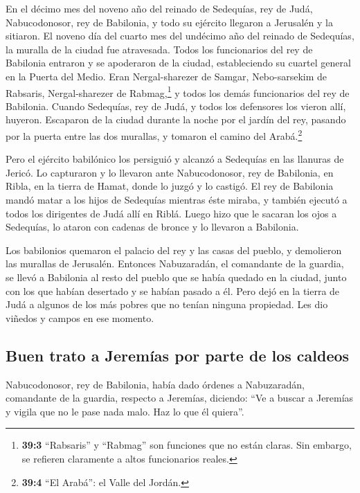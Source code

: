  En el décimo mes del noveno año del reinado de Sedequías,
rey de Judá, Nabucodonosor, rey de Babilonia, y todo su ejército
llegaron a Jerusalén y la sitiaron.  El noveno día del
cuarto mes del undécimo año del reinado de Sedequías, la muralla de la
ciudad fue atravesada.  Todos los funcionarios del rey de
Babilonia entraron y se apoderaron de la ciudad, estableciendo su
cuartel general en la Puerta del Medio. Eran Nergal-sharezer de Samgar,
Nebo-sarsekim de Rabsaris, Nergal-sharezer de Rabmag,\footnote{\textbf{39:3}
  ``Rabsaris'' y ``Rabmag'' son funciones que no están claras. Sin
  embargo, se refieren claramente a altos funcionarios reales.} y todos
los demás funcionarios del rey de Babilonia.  Cuando
Sedequías, rey de Judá, y todos los defensores los vieron allí, huyeron.
Escaparon de la ciudad durante la noche por el jardín del rey, pasando
por la puerta entre las dos murallas, y tomaron el camino del
Arabá.\footnote{\textbf{39:4} ``El Arabá'': el Valle del Jordán.}

 Pero el ejército babilónico los persiguió y alcanzó a
Sedequías en las llanuras de Jericó. Lo capturaron y lo llevaron ante
Nabucodonosor, rey de Babilonia, en Ribla, en la tierra de Hamat, donde
lo juzgó y lo castigó.  El rey de Babilonia mandó matar a
los hijos de Sedequías mientras éste miraba, y también ejecutó a todos
los dirigentes de Judá allí en Riblá.  Luego hizo que le
sacaran los ojos a Sedequías, lo ataron con cadenas de bronce y lo
llevaron a Babilonia.

 Los babilonios quemaron el palacio del rey y las casas
del pueblo, y demolieron las murallas de Jerusalén. 
Entonces Nabuzaradán, el comandante de la guardia, se llevó a Babilonia
al resto del pueblo que se había quedado en la ciudad, junto con los que
habían desertado y se habían pasado a él.  Pero dejó en
la tierra de Judá a algunos de los más pobres que no tenían ninguna
propiedad. Les dio viñedos y campos en ese momento.

\hypertarget{buen-trato-a-jeremuxedas-por-parte-de-los-caldeos}{%
\subsection{Buen trato a Jeremías por parte de los
caldeos}\label{buen-trato-a-jeremuxedas-por-parte-de-los-caldeos}}

 Nabucodonosor, rey de Babilonia, había dado órdenes a
Nabuzaradán, comandante de la guardia, respecto a Jeremías, diciendo:
 ``Ve a buscar a Jeremías y vigila que no le pase nada
malo. Haz lo que él quiera''.

